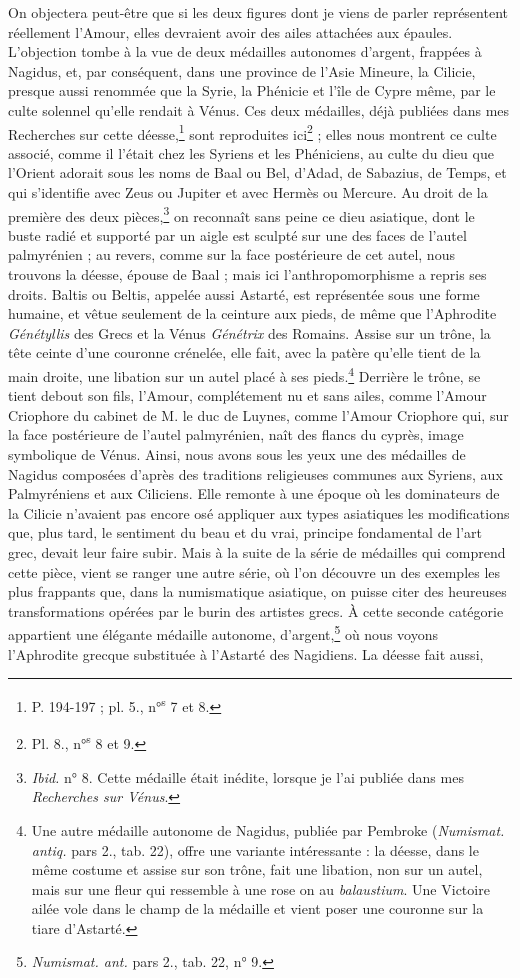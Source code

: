 \documentclass{article}
\begin{document}
On objectera peut-être que si les deux figures dont je viens de parler représentent réellement l'Amour, elles devraient avoir des ailes attachées aux épaules. L'objection tombe à la vue de deux médailles autonomes d'argent, frappées à Nagidus, et, par conséquent, dans une province de l'Asie Mineure, la Cilicie, presque aussi renommée que la Syrie, la Phénicie et l'île de Cypre même, par le culte solennel qu'elle rendait à Vénus. Ces deux médailles, déjà publiées dans mes Recherches sur cette déesse,\footnote{P. 194-197 ; pl. 5., n°\textsuperscript{s} 7 et 8.} sont reproduites ici\footnote{Pl. 8., n°\textsuperscript{s} 8 et 9.} ; elles nous montrent ce culte associé, comme il l'était chez les Syriens et les Phéniciens, au culte du dieu que l'Orient adorait sous les noms de Baal ou Bel, d'Adad, de Sabazius, de Temps, et qui s'identifie avec Zeus ou Jupiter et avec Hermès ou Mercure. Au droit de la première des deux pièces,\footnote{\emph{Ibid.} n° 8. Cette médaille était inédite, lorsque je l'ai publiée dans mes \emph{Recherches sur Vénus}.} on reconnaît sans peine ce dieu asiatique, dont le buste radié et supporté par un aigle est sculpté sur une des faces de l'autel palmyrénien ; au revers, comme sur la face postérieure de cet autel, nous trouvons la déesse, épouse de Baal ; mais ici l'anthropomorphisme a repris ses droits. Baltis ou Beltis, appelée aussi Astarté, est représentée sous une forme humaine, et vêtue seulement de la ceinture aux pieds, de même que l'Aphrodite \emph{Génétyllis} des Grecs et la Vénus \emph{Génétrix} des Romains. Assise sur un trône, la tête ceinte d'une couronne crénelée, elle fait, avec la patère qu'elle tient de la main droite, une libation sur un autel placé à ses pieds.\footnote{Une autre médaille autonome de Nagidus, publiée par Pembroke (\emph{Numismat. antiq.} pars 2., tab. 22), offre une variante intéressante : la déesse, dans le même costume et assise sur son trône, fait une libation, non sur un autel, mais sur une fleur qui ressemble à une rose on au \emph{balaustium}. Une Victoire ailée vole dans le champ de la médaille et vient poser une couronne sur la tiare d'Astarté.} Derrière le trône, se tient debout son fils, l'Amour, complétement nu et sans ailes, comme l'Amour Criophore du cabinet de M. le duc de Luynes, comme l'Amour Criophore qui, sur la face postérieure de l'autel palmyrénien, naît des flancs du cyprès, image symbolique de Vénus. Ainsi, nous avons sous les yeux une des médailles de Nagidus composées d'après des traditions religieuses communes aux Syriens, aux Palmyréniens et aux Ciliciens. Elle remonte à une époque où les dominateurs de la Cilicie n'avaient pas encore osé appliquer aux types asiatiques les modifications que, plus tard, le sentiment du beau et du vrai, principe fondamental de l'art grec, devait leur faire subir. Mais à la suite de la série de médailles qui comprend cette pièce, vient se ranger une autre série, où l'on découvre un des exemples les plus frappants que, dans la numismatique asiatique, on puisse citer des heureuses transformations opérées par le burin des artistes grecs. À cette seconde catégorie appartient une élégante médaille autonome, d'argent,\footnote{\emph{Numismat. ant.} pars 2., tab. 22, n° 9.} où nous voyons l'Aphrodite grecque substituée à l'Astarté des Nagidiens. La déesse fait aussi, 
\end{document}
